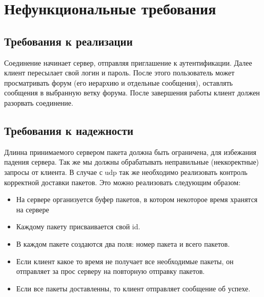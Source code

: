 \documentclass[10pt,a4paper]{report}
\begin{document}
\chapter{Нефункциональные требования}
\section{Требования к реализации}
Соединение начинает сервер, отправляя приглашение к аутентификации. Далее клиент пересылает свой логин и пароль. После этого пользователь может просматривать форум (его иерархию и отдельные сообщения), оставлять сообщения в выбранную ветку форума. После завершения работы клиент должен разорвать соединение.
\section{Требования к надежности}
Длинна принимаемого сервером пакета должна быть ограничена, для избежания падения сервера. Так же мы должны обрабатывать неправильные (неккоректные) запросы от клиента. В случае с udp так же необходимо реализовать контроль корректной доставки пакетов. Это можно реализовать следующим образом:
\begin{itemize}
\item На сервере организуется буфер пакетов, в котором некоторое время хранятся на сервере
\item Каждому пакету присваивается свой id.
\item В каждом пакете создаются два поля: номер пакета и всего пакетов.
\item Если клиент какое то время не получает все необходимые пакеты, он отправляет за прос серверу на повторную отправку пакетов.
\item Если все пакеты доставленны, то клиент отправляет сообщение об успехе.
\end{itemize}
\end{document}
